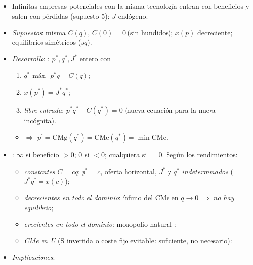 \documentclass{article}
\begin{document}
\begin{columnas}
\begin{itemize}
\item Infinitas empresas potenciales con la misma tecnología entran con beneficios y salen con pérdidas (supuesto 5): $J$ endógeno.
\end{itemize}
\begin{itemize}
\item \emph{Supuestos}: misma $C(q)$, $C(0)=0$ (sin hundidos); $x(p)$ decreciente; equilibrios simétricos ($Jq$).
\item \emph{Desarrollo}: : $p^*,q^*,J^*$ entero con
  \begin{enumerate}
  \item $q^*$ máx.\ $p^*q-C(q)$;
  \item $x(p^*)=J^*q^*$;
  \item \emph{libre entrada}: $p^*q^*-C(q^*)=0$ (nueva ecuación para la nueva incógnita).
  \end{enumerate}
  \begin{itemize}
  \item $\Rightarrow$ $p^*=\mathrm{CMg}(q^*)=\mathrm{CMe}(q^*)=\min\mathrm{CMe}$.
  \end{itemize}
\item {}: $\infty$ si beneficio $>0$; 0~si $<0$; cualquiera si $=0$. Según los rendimientos:
  \begin{itemize}
  \item \emph{constantes} $C=cq$: $p^*=c$, oferta horizontal, $J^*$ y $q^*$ \emph{indeterminados} ($J^*q^*=x(c)$);
  \item \emph{decrecientes en todo el dominio}: ínfimo del CMe en $q\to0$ $\Rightarrow$ \emph{no hay equilibrio};
  \item \emph{crecientes en todo el dominio}: monopolio natural ;
  \item \emph{CMe en U} (S invertida o coste fijo evitable: suficiente, no necesario):
  \end{itemize}
\end{itemize}
\begin{itemize}
\item \emph{Implicaciones}:

\end{itemize}
\end{columnas}
\end{document}
